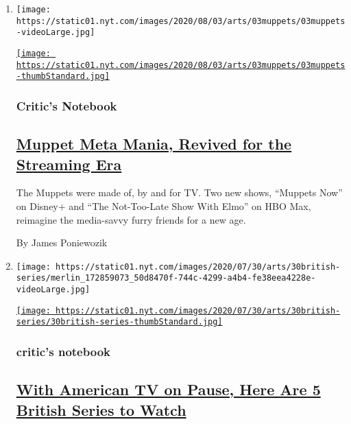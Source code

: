 \begin{enumerate}
\def\labelenumi{\arabic{enumi}.}
\item
  \texttt{[image: https://static01.nyt.com/images/2020/08/03/arts/03muppets/03muppets-videoLarge.jpg]}

  \href{/2020/07/31/arts/television/muppets-now.html}{\texttt{[image: https://static01.nyt.com/images/2020/08/03/arts/03muppets/03muppets-thumbStandard.jpg]}}

  \hypertarget{critics-notebook}{%
  \subsubsection{Critic's Notebook}\label{critics-notebook}}

  \hypertarget{muppet-meta-mania-revived-for-the-streaming-era}{%
  \subsection{\texorpdfstring{\href{/2020/07/31/arts/television/muppets-now.html}{Muppet
  Meta Mania, Revived for the Streaming
  Era}}{Muppet Meta Mania, Revived for the Streaming Era}}\label{muppet-meta-mania-revived-for-the-streaming-era}}

  The Muppets were made of, by and for TV. Two new shows, ``Muppets
  Now'' on Disney+ and ``The Not-Too-Late Show With Elmo'' on HBO Max,
  reimagine the media-savvy furry friends for a new age.

  By James Poniewozik
\item
  \texttt{[image: https://static01.nyt.com/images/2020/07/30/arts/30british-series/merlin\_172859073\_50d8470f-744c-4299-a4b4-fe38eea4228e-videoLarge.jpg]}

  \href{/2020/07/30/arts/television/in-my-skin-hulu.html}{\texttt{[image: https://static01.nyt.com/images/2020/07/30/arts/30british-series/30british-series-thumbStandard.jpg]}}

  \hypertarget{critics-notebook-1}{%
  \subsubsection{critic's notebook}\label{critics-notebook-1}}

  \hypertarget{with-american-tv-on-pause-here-are-5-british-series-to-watch}{%
  \subsection{\texorpdfstring{\href{/2020/07/30/arts/television/in-my-skin-hulu.html}{With
  American TV on Pause, Here Are 5 British Series to
  Watch}}{With American TV on Pause, Here Are 5 British Series to Watch}}\label{with-american-tv-on-pause-here-are-5-british-series-to-watch}}


\end{enumerate}
